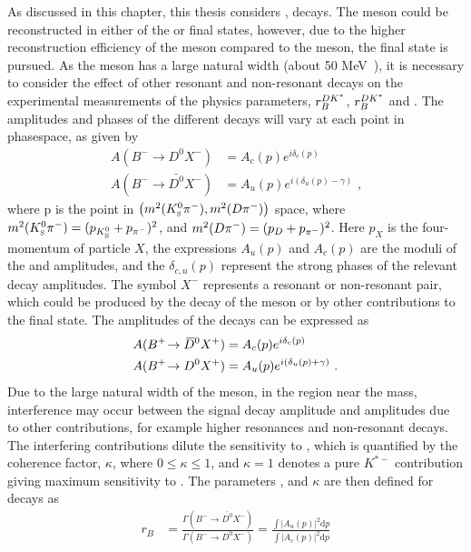 As discussed in this chapter, this thesis considers \decay{\Bm}{\D\Kstarm}, \decay{\Kstarm}{\KS\pim} decays. The \Kstarm meson could be reconstructed in either of the \KS\piz or \Km\piz final states, however, due to the higher reconstruction efficiency of the \KS meson compared to the \piz meson, the \KS\pim final state is pursued. As the \Kstarm meson has a large natural width (about 50 MeV~\cite{PDG2016}), it is necessary to consider the effect of other resonant and non-resonant \decay{\Bm}{\D\KS\pim} decays on the experimental measurements of the physics parameters, $r_B^{DK^*}$, $r_B^{DK^*}$ and \Pgamma. The amplitudes and phases of the different decays will vary at each point in \decay{\Bm}{\D\KS\pim} phasespace, as given by
\begin{align*}
A(B^- \to D^0 X^-) &= A_c(p) e^{i\delta_c(p)} \\
A(B^- \to \bar{D^0} X^-) &= A_u(p) e^{i(\delta_u(p) - \gamma)} \text{ ,}
\end{align*}
where p is the point in $\left(m^2({{K}^0_{\mathrm{ \scriptscriptstyle S}}}{{\pi}^-}),m^2({D}{{\pi}^-})\right)$ space, where $m^2({{K}^0_{\mathrm{ \scriptscriptstyle S}}}{{\pi}^-}) = (p_{{{K}^0_{\mathrm{ \scriptscriptstyle S}}}} + p_{{{\pi}^-}})^2$, and $m^2({D}{{\pi}^-}) = (p_{{D}} + p_{{{\pi}^-}})^2$. Here $p_{X}$ is the four-momentum of particle $X$, the expressions $A_u(p)$ and $A_c(p)$ are the moduli of the \decay{\bquark}{\uquark} and \decay{\bquark}{\cquark} amplitudes, and the $\delta_{c,u}(p)$ represent the strong phases of the relevant decay amplitudes. The symbol $X^-$ represents a resonant or non-resonant \KS\pim pair, which could be produced by the decay of the \Kstarm meson or by other contributions to the \decay{\Bm}{\D\KS\pim} final state. The amplitudes of the \Bp decays can be expressed as 
\begin{align*}
A({{{B}^+}}\!\rightarrow {\ensuremath{{\kern 0.2em\overline{\kern -0.2em D}{}}{}^0}} X^+) &= A_c(p) e^{i\delta_c(p)} \\
A({{{B}^+}}\!\rightarrow {\ensuremath{{D}^0}} X^+) &= A_u(p) e^{i(\delta_u(p) + \gamma)} \text{ .}
\end{align*}
Due to the large natural width of the \Kstarm meson, in the region near the \Kstarm mass, interference may occur between the signal \Kstarm decay amplitude and amplitudes due to other \decay{\Bm}{\D\KS\pim} contributions, for example higher \KS\pim resonances and non-resonant decays. The interfering contributions dilute the sensitivity to \Pgamma, which is quantified by the \btodkst coherence factor, $\kappa$, where $0 \leq \kappa \leq 1$, and $\kappa = 1$ denotes a pure $K^{*-}$ contribution giving maximum sensitivity to \Pgamma. The parameters \rb, \deltab and $\kappa$ are then defined for \btodkst decays as
\begin{align}
r_B &= \frac{\Gamma(B^- \to \bar{D^0}X^-)}{\Gamma(B^- \to D^0X^-)} = \frac{\int \left|A_u(p)\right|^2 \mathrm{d}p}{\int \left|A_c(p)\right|^2 \mathrm{d}p}
\label{rbdefinition}
\end{align}
